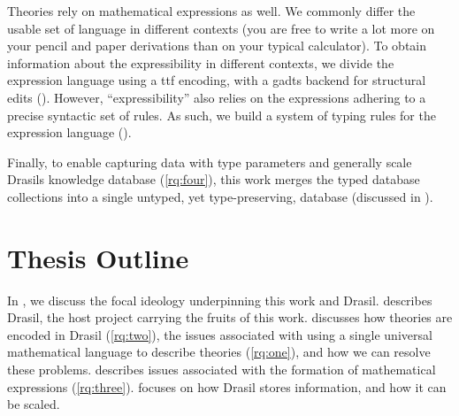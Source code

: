 Theories rely on mathematical expressions as well. We commonly differ the usable
set of language in different contexts (you are free to write a lot more on your
pencil and paper derivations than on your typical calculator). To obtain
information about the expressibility in different contexts, we divide the
expression language using a \acs{ttf} \cite{Carette2009} encoding, with a
\acsp{gadt} backend for structural edits (). However,
``expressibility'' also relies on the expressions adhering to a precise
syntactic set of rules. As such, we build a system of typing rules for the
expression language ().

Finally, to enable capturing data with type parameters and generally scale
Drasils knowledge database (\ref{rq:four}), this work merges the typed database
collections into a single untyped, yet type-preserving, database (discussed in
).

\section{Thesis Outline}
\label{sec:intro:outline}

In , we discuss the focal ideology underpinning this work
and Drasil.  describes Drasil, the host project carrying the
fruits of this work.  discusses how theories are encoded
in Drasil (\ref{rq:two}), the issues associated with using a single universal
mathematical language to describe theories (\ref{rq:one}), and how we can
resolve these problems.  describes issues associated with
the formation of mathematical expressions (\ref{rq:three}).
 focuses on how Drasil stores information, and how it
can be scaled.
